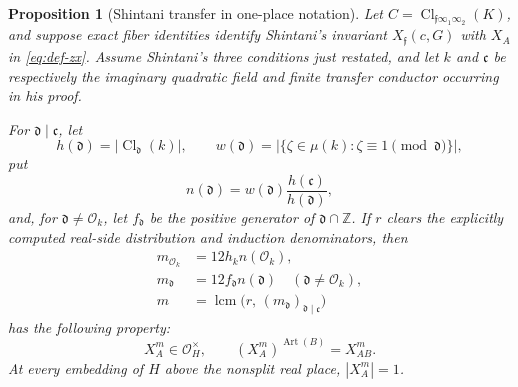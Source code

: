 \documentclass[11pt]{article}
\newtheorem{proposition}[theorem]{Proposition}
\newcommand{\Z}{\mathbb Z}
\newcommand{\Cl}{\operatorname{Cl}}
\begin{document}
\begin{proposition}[Shintani transfer in one-place notation]
\label{prop:transfer}
Let \(C=\Cl_{\mathfrak f\infty_1\infty_2}(K)\), and suppose exact
fiber identities identify Shintani's invariant
\(X_{\mathfrak f}(c,G)\) with \(X_A\) in
\eqref{eq:def-zx}.  Assume Shintani's
three conditions just restated, and let \(k\) and
\(\mathfrak c\) be respectively the imaginary quadratic field and
finite transfer conductor occurring in his proof.

For \(\mathfrak d\mid\mathfrak c\), let
\[
 h(\mathfrak d)=|\Cl_{\mathfrak d}(k)|,\qquad
 w(\mathfrak d)
 =|\{\zeta\in\mu(k):\zeta\equiv1\pmod{\mathfrak d}\}|,
\]
put
\begin{equation}\label{eq:distribution-index}
 n(\mathfrak d)
 =w(\mathfrak d)\frac{h(\mathfrak c)}{h(\mathfrak d)},
\end{equation}
and, for \(\mathfrak d\ne\mathcal O_k\), let
\(f_{\mathfrak d}\) be the positive generator of
\(\mathfrak d\cap\Z\).  If \(r\) clears the explicitly computed
real-side distribution and induction denominators, then
\begin{equation}\label{eq:safe-exponent}
\begin{split}
 m_{\mathcal O_k}&=12h_k n(\mathcal O_k),\\
 m_{\mathfrak d}&=12f_{\mathfrak d}n(\mathfrak d)
 \quad(\mathfrak d\ne\mathcal O_k),\\
 m&=\operatorname{lcm}\bigl(r,\,
       (m_{\mathfrak d})_{\mathfrak d\mid\mathfrak c}\bigr)
\end{split}
\end{equation}
has the following property:
\begin{equation}\label{eq:shintani-conclusion}
 X_A^m\in\mathcal O_H^\times,\qquad
 (X_A^m)^{\operatorname{Art}(B)}=X_{AB}^m.
\end{equation}
At every embedding of \(H\) above the nonsplit real place,
\(|X_A^m|=1\).
\end{proposition}
\end{document}
